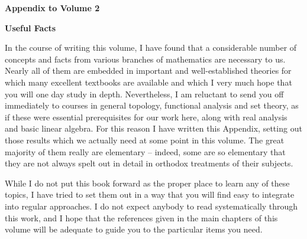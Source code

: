  
\def\RoverC{\hbox{\biggerscriptfonts${{\Bbb R}\atop{\Bbb C}}$}} 
 
\def\chaptername{Appendix} 
\def\sectionname{Introduction} 
 
\gdef\topparagraph{} 
\gdef\bottomparagraph{Appendix to Vol.\ 2 {\it intro.}} 
 
\centerline{\bf Appendix to Volume 2} 
 
\medskip 
 
\centerline{\bf Useful Facts} 
 
\medskip 
 
In the course of writing this volume, I have found that a considerable 
number of 
concepts and facts from various branches of mathematics are necessary to 
us.   Nearly all of them are embedded in important and well-established 
theories for which many excellent textbooks are available and which I 
very much hope that you will one day study in depth.   Nevertheless, I 
am reluctant to send you off immediately to courses in 
general topology, functional analysis and set theory, as if these were 
essential prerequisites for our work here, along with real analysis and 
basic linear algebra.   For this reason I have written this 
Appendix, setting out those results which we actually need at some point 
in this volume.   The great majority of them really are  
elementary -- indeed, some are so 
elementary that they are not always spelt out in detail in orthodox 
treatments of their subjects. 
 
While I do not put this book forward as the proper place to learn any of 
these topics, I have tried to set them out in a way that you will find 
easy to integrate into regular approaches.   I do not expect anybody to 
read systematically through this work, and I hope that the references 
given in the main chapters of this volume will be adequate to guide you 
to the particular items you need. 
 
\discrpage 
 
